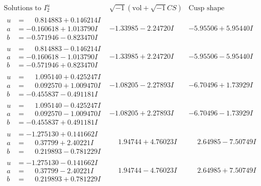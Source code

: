 \documentclass[1p]{elsarticle_modified}
\theoremstyle{definition}
\newcommand{\I}{\sqrt{-1}}
\begin{document}
$$\begin{array}{c|c|c}  
\text{Solutions to }I^u_{2}& \I (\text{vol} + \sqrt{-1}CS) & \text{Cusp shape}\\
 \hline 
\begin{aligned}
u &= \phantom{-}0.814883 + 0.146214 I \\
a &= -0.160618 + 1.013790 I \\
b &= -0.571946 - 0.823470 I\end{aligned}
 & -1.33985 - 2.24720 I & -5.95506 + 5.95440 I \\ \hline\begin{aligned}
u &= \phantom{-}0.814883 - 0.146214 I \\
a &= -0.160618 - 1.013790 I \\
b &= -0.571946 + 0.823470 I\end{aligned}
 & -1.33985 + 2.24720 I & -5.95506 - 5.95440 I \\ \hline\begin{aligned}
u &= \phantom{-}1.095140 + 0.425247 I \\
a &= \phantom{-}0.092570 + 1.009470 I \\
b &= -0.455837 - 0.491181 I\end{aligned}
 & -1.08205 - 2.27893 I & -6.70496 + 1.73929 I \\ \hline\begin{aligned}
u &= \phantom{-}1.095140 - 0.425247 I \\
a &= \phantom{-}0.092570 - 1.009470 I \\
b &= -0.455837 + 0.491181 I\end{aligned}
 & -1.08205 + 2.27893 I & -6.70496 - 1.73929 I \\ \hline\begin{aligned}
u &= -1.275130 + 0.141662 I \\
a &= \phantom{-}0.37799 + 2.40221 I \\
b &= \phantom{-}0.219893 - 0.781229 I\end{aligned}
 & \phantom{-}1.94744 + 4.76023 I & \phantom{-}2.64985 - 7.50749 I \\ \hline\begin{aligned}
u &= -1.275130 - 0.141662 I \\
a &= \phantom{-}0.37799 - 2.40221 I \\
b &= \phantom{-}0.219893 + 0.781229 I\end{aligned}
 & \phantom{-}1.94744 - 4.76023 I & \phantom{-}2.64985 + 7.50749 I \\ \hline\begin{aligned}

\end{aligned}
\end{array}$$
\end{document}
